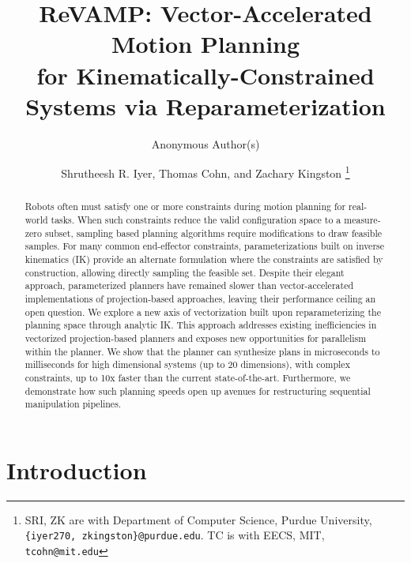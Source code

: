 \documentclass[letterpaper, 10 pt, conference]{ieeeconf}
\title{\LARGE \bf
ReVAMP: Vector-Accelerated Motion Planning \\ for Kinematically-Constrained Systems via Reparameterization
}
\author{Anonymous Author(s)}
\author{
Shrutheesh R. Iyer, Thomas Cohn, and Zachary Kingston%
\thanks{SRI, ZK are with Department of Computer Science, Purdue University, {\tt \{iyer270,  zkingston\}@purdue.edu}. 
TC is with EECS, MIT, {\tt tcohn@mit.edu}}%
\\
}
\begin{document}
\maketitle



\begin{abstract}
Robots often must satisfy one or more constraints during motion planning for real-world tasks. When such constraints reduce the valid configuration space to a measure-zero subset, sampling based planning algorithms require modifications to draw feasible samples. For many common end-effector constraints, parameterizations built on inverse kinematics (IK) provide an alternate formulation where the constraints are satisfied by construction, allowing directly sampling the feasible set. Despite their elegant approach, parameterized planners have remained slower than vector-accelerated implementations of projection-based approaches, leaving their performance ceiling an open question. We explore a new axis of vectorization built upon reparameterizing the planning space through analytic IK. This approach addresses existing inefficiencies in vectorized projection-based planners and exposes new opportunities for parallelism within the planner. We show that the planner can synthesize plans in microseconds to milliseconds for high dimensional systems (up to 20 dimensions), with complex constraints, up to 10x faster than the current state-of-the-art. Furthermore, we demonstrate how such planning speeds open up avenues for restructuring sequential manipulation pipelines.
\end{abstract}

\section{Introduction}

\end{document}
